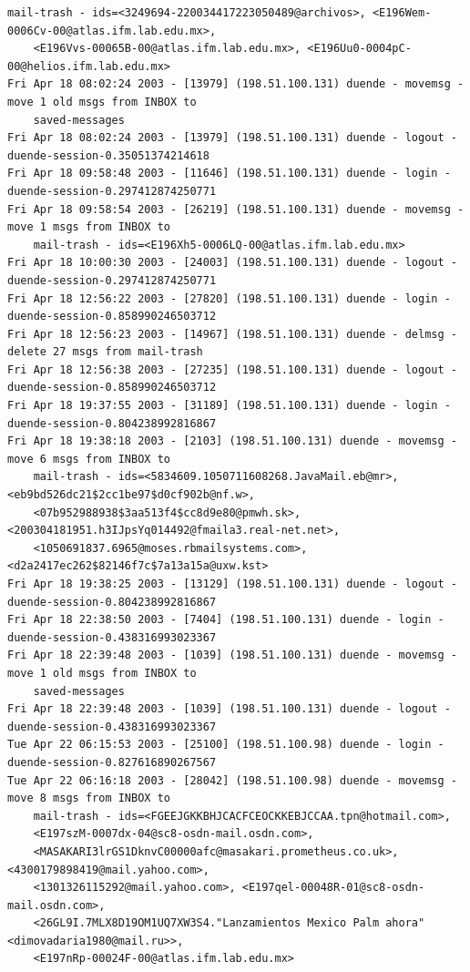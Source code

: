 \begin{lstlisting}[style=terminal]
    mail-trash - ids=<3249694-220034417223050489@archivos>, <E196Wem-0006Cv-00@atlas.ifm.lab.edu.mx>, 
    <E196Vvs-00065B-00@atlas.ifm.lab.edu.mx>, <E196Uu0-0004pC-00@helios.ifm.lab.edu.mx>
Fri Apr 18 08:02:24 2003 - [13979] (198.51.100.131) duende - movemsg - move 1 old msgs from INBOX to 
    saved-messages
Fri Apr 18 08:02:24 2003 - [13979] (198.51.100.131) duende - logout - duende-session-0.35051374214618
Fri Apr 18 09:58:48 2003 - [11646] (198.51.100.131) duende - login - duende-session-0.297412874250771
Fri Apr 18 09:58:54 2003 - [26219] (198.51.100.131) duende - movemsg - move 1 msgs from INBOX to 
    mail-trash - ids=<E196Xh5-0006LQ-00@atlas.ifm.lab.edu.mx>
Fri Apr 18 10:00:30 2003 - [24003] (198.51.100.131) duende - logout - duende-session-0.297412874250771
Fri Apr 18 12:56:22 2003 - [27820] (198.51.100.131) duende - login - duende-session-0.858990246503712
Fri Apr 18 12:56:23 2003 - [14967] (198.51.100.131) duende - delmsg - delete 27 msgs from mail-trash
Fri Apr 18 12:56:38 2003 - [27235] (198.51.100.131) duende - logout - duende-session-0.858990246503712
Fri Apr 18 19:37:55 2003 - [31189] (198.51.100.131) duende - login - duende-session-0.804238992816867
Fri Apr 18 19:38:18 2003 - [2103] (198.51.100.131) duende - movemsg - move 6 msgs from INBOX to 
    mail-trash - ids=<5834609.1050711608268.JavaMail.eb@mr>, <eb9bd526dc21$2cc1be97$d0cf902b@nf.w>, 
    <07b952988938$3aa513f4$cc8d9e80@pmwh.sk>, <200304181951.h3IJpsYq014492@fmaila3.real-net.net>, 
    <1050691837.6965@moses.rbmailsystems.com>, <d2a2417ec262$82146f7c$7a13a15a@uxw.kst>
Fri Apr 18 19:38:25 2003 - [13129] (198.51.100.131) duende - logout - duende-session-0.804238992816867
Fri Apr 18 22:38:50 2003 - [7404] (198.51.100.131) duende - login - duende-session-0.438316993023367
Fri Apr 18 22:39:48 2003 - [1039] (198.51.100.131) duende - movemsg - move 1 old msgs from INBOX to 
    saved-messages
Fri Apr 18 22:39:48 2003 - [1039] (198.51.100.131) duende - logout - duende-session-0.438316993023367
Tue Apr 22 06:15:53 2003 - [25100] (198.51.100.98) duende - login - duende-session-0.827616890267567
Tue Apr 22 06:16:18 2003 - [28042] (198.51.100.98) duende - movemsg - move 8 msgs from INBOX to 
    mail-trash - ids=<FGEEJGKKBHJCACFCEOCKKEBJCCAA.tpn@hotmail.com>, 
    <E197szM-0007dx-04@sc8-osdn-mail.osdn.com>, 
    <MASAKARI3lrGS1DknvC00000afc@masakari.prometheus.co.uk>, <4300179898419@mail.yahoo.com>, 
    <1301326115292@mail.yahoo.com>, <E197qel-00048R-01@sc8-osdn-mail.osdn.com>, 
    <26GL9I.7MLX8D19OM1UQ7XW3S4."Lanzamientos Mexico Palm ahora"<dimovadaria1980@mail.ru>>, 
    <E197nRp-00024F-00@atlas.ifm.lab.edu.mx>

\end{lstlisting}
